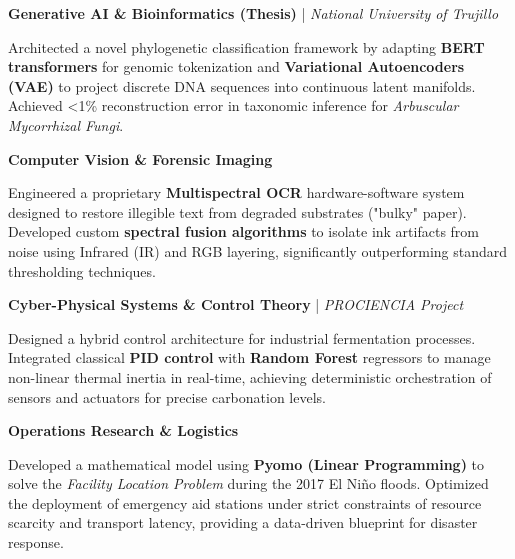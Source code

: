 
\item
\textbf{Generative AI \& Bioinformatics (Thesis)} | \textit{National University of Trujillo}
\resumeItemListStart
    \item Architected a novel phylogenetic classification framework by adapting \textbf{BERT transformers} for genomic tokenization and \textbf{Variational Autoencoders (VAE)} to project discrete DNA sequences into continuous latent manifolds. Achieved <1\% reconstruction error in taxonomic inference for \textit{Arbuscular Mycorrhizal Fungi}.
\resumeItemListEnd

\item
\textbf{Computer Vision \& Forensic Imaging}
\resumeItemListStart
    \item Engineered a proprietary \textbf{Multispectral OCR} hardware-software system designed to restore illegible text from degraded substrates ("bulky" paper). Developed custom \textbf{spectral fusion algorithms} to isolate ink artifacts from noise using Infrared (IR) and RGB layering, significantly outperforming standard thresholding techniques.
\resumeItemListEnd

\item
\textbf{Cyber-Physical Systems \& Control Theory} | \textit{PROCIENCIA Project}
\resumeItemListStart
    \item Designed a hybrid control architecture for industrial fermentation processes. Integrated classical \textbf{PID control} with \textbf{Random Forest} regressors to manage non-linear thermal inertia in real-time, achieving deterministic orchestration of sensors and actuators for precise carbonation levels.
\resumeItemListEnd

\item
\textbf{Operations Research \& Logistics}
\resumeItemListStart
    \item Developed a mathematical model using \textbf{Pyomo (Linear Programming)} to solve the \textit{Facility Location Problem} during the 2017 El Niño floods. Optimized the deployment of emergency aid stations under strict constraints of resource scarcity and transport latency, providing a data-driven blueprint for disaster response.
\resumeItemListEnd
